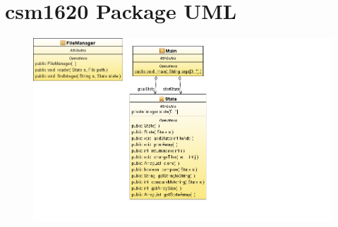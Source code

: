 \documentclass[journal]{IEEEtran}
\begin{document}

%


\appendices
\newpage
\onecolumn

\section{csm1620 Package UML}\label{csm6120PackageUML}

\begin{figure}[h]
\centering
\includegraphics[width=1.4\textwidth,natwidth=610,natheight=642]{../Model/CSM6120_Assignment2-Model/ClassDiagram1.png} 

\end{figure}
\end{document}
